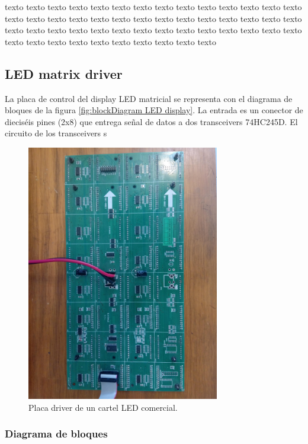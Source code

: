\documentclass[
11pt, %
]{charter}
\begin{document}
texto texto texto texto texto texto texto texto texto texto texto texto texto texto texto texto texto texto texto texto texto texto texto texto texto texto texto texto texto texto texto texto texto texto texto texto texto texto texto texto texto texto texto texto texto texto texto texto texto texto texto texto 




\pagebreak
\subsection{LED matrix driver}
La placa de control del display LED matricial se representa con el diagrama de bloques de la figura \ref{fig:blockDiagram LED display}. La entrada es un conector de dieciséis pines (2x8) que entrega señal de datos a dos transceivers 74HC245D. El circuito de los transceivers s

\begin{figure}[htpb]
\centering 
\includegraphics[width=0.75\textwidth, angle=90]{./Pics/IMG_20220326_173044.jpg}
\caption{Placa driver de un cartel LED comercial.}
\label{fig:driver cartel LED comercial}
\end{figure}


\subsubsection{Diagrama de bloques}
\end{document}
